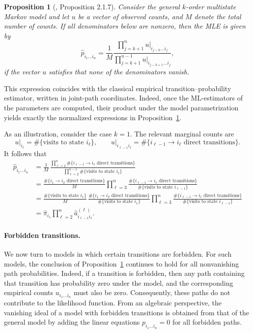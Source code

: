 \documentclass[11pt, a4paper]{article}
\numberwithin{equation}{section}
\theoremstyle{plain}
\newtheorem{proposition}[theorem]{Proposition}
\theoremstyle{definition}
\begin{document}
\begin{proposition}[\cite{drton-sturmfels-sullivant}, Proposition 2.1.7]\label{prop:mle hierarchical}
Consider the general $k$-order multistate Markov model and let $u$ be a vector of observed counts, and $M$ denote the total number of counts.
If all denominators below are nonzero, then the MLE is given by
    \[
    \hat{p}_{i_1\ldots i_n} = \frac{1}{M}\frac{\prod_{j=k+1}^n u|_{i_{j-k}\ldots i_j}}{\prod_{j=k+1}^{n-1} u|_{i_{j-k+1}\ldots i_j}},
    \]
    if the vector $u$ satisfies that none of the denominators vanish.
\end{proposition}
This expression coincides with the classical empirical transition–probability estimator,
written in joint-path coordinates.
Indeed, once the ML-estimators of the parameters are computed,
their product under the model parametrization yields exactly the normalized expressions
in Proposition~\ref{prop:mle hierarchical}.

As an illustration, consider the case $k=1$.
The relevant marginal counts are
\[
u\big|_{i_\ell}
=
\#\{\text{visits to state } i_\ell\},
\qquad
u\big|_{i_{\ell-1}i_\ell}
=
\#\{i_{\ell-1}\to i_\ell \text{ direct transitions}\}.
\]
It follows that
\begin{align*}
\hat{p}_{i_1\ldots i_n}
&=
\frac{1}{M}\,
\frac{\prod_{\ell=2}^n
\#\{i_{\ell-1}\to i_\ell \text{ direct transitions}\}}
{\prod_{\ell=2}^{n-1}
\#\{\text{visits to state } i_\ell\}}
\\
&=
\frac{\#\{i_1\to i_2 \text{ direct transitions}\}}{M}
\prod_{\ell=3}^n
\frac{\#\{i_{\ell-1}\to i_\ell \text{ direct transitions}\}}
{\#\{\text{visits to state } i_{\ell-1}\}}
\\
&=
\frac{\#\{\text{visits to state } i_1\}}{M}\,
\frac{\#\{i_1\to i_2 \text{ direct transitions}\}}
{\#\{\text{visits to state } i_1\}}
\prod_{\ell=3}^n
\frac{\#\{i_{\ell-1}\to i_\ell \text{ direct transitions}\}}
{\#\{\text{visits to state } i_{\ell-1} \}}
\\
&=
\hat{\pi}_{i_1}\prod_{\ell=2}^n \hat{a}^{(\ell)}_{i_{\ell-1} i_\ell}.
\end{align*}


\paragraph{Forbidden transitions.}
We now turn to models in which certain transitions are forbidden.
For such models, the conclusion of Proposition~\ref{prop:mle hierarchical} continues to hold
for all nonvanishing path probabilities.
Indeed, if a transition is forbidden, then any path containing that transition has probability
zero under the model, and the corresponding empirical counts
$u_{i_1\ldots i_n}$ must also be zero.
Consequently, these paths do not contribute to the likelihood function.
From an algebraic perspective, the vanishing ideal of a model with forbidden transitions
is obtained from that of the general model by adding the linear equations
$p_{i_1\ldots i_n}=0$ for all forbidden paths.
\end{document}
